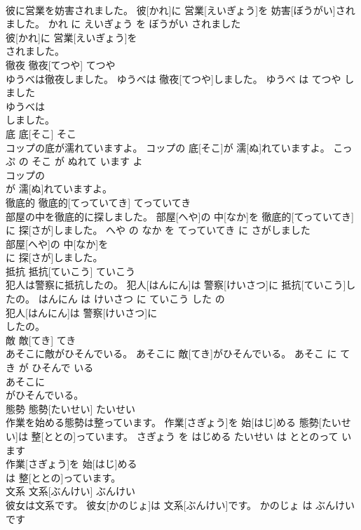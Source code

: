 \documentclass[8pt]{extreport}
\begin{document}
\begin{CJK}{UTF8}{min}
\\	彼に営業を妨害されました。	彼[かれ]に 営業[えいぎょう]を 妨害[ぼうがい]されました。	かれ に えいぎょう を ぼうがい されました	
\\	彼[かれ]に 営業[えいぎょう]を
\\	されました。			
\\	徹夜	徹夜[てつや]	てつや	
\\	ゆうべは徹夜しました。	ゆうべは 徹夜[てつや]しました。	ゆうべ は てつや しました	
\\	ゆうべは
\\	しました。			
\\	底	底[そこ]	そこ	
\\	コップの底が濡れていますよ。	コップの 底[そこ]が 濡[ぬ]れていますよ。	こっぷ の そこ が ぬれて います よ	
\\	コップの
\\	が 濡[ぬ]れていますよ。			
\\	徹底的	徹底的[てっていてき]	てっていてき	
\\	部屋の中を徹底的に探しました。	部屋[へや]の 中[なか]を 徹底的[てっていてき]に 探[さが]しました。	へや の なか を てっていてき に さがしました	
\\	部屋[へや]の 中[なか]を
\\	に 探[さが]しました。			
\\	抵抗	抵抗[ていこう]	ていこう	
\\	犯人は警察に抵抗したの。	犯人[はんにん]は 警察[けいさつ]に 抵抗[ていこう]したの。	はんにん は けいさつ に ていこう した の	
\\	犯人[はんにん]は 警察[けいさつ]に
\\	したの。			
\\	敵	敵[てき]	てき	
\\	あそこに敵がひそんでいる。	あそこに 敵[てき]がひそんでいる。	あそこ に てき が ひそんで いる	
\\	あそこに
\\	がひそんでいる。			
\\	態勢	態勢[たいせい]	たいせい	
\\	作業を始める態勢は整っています。	作業[さぎょう]を 始[はじ]める 態勢[たいせい]は 整[ととの]っています。	さぎょう を はじめる たいせい は ととのって います	
\\	作業[さぎょう]を 始[はじ]める
\\	は 整[ととの]っています。			
\\	文系	文系[ぶんけい]	ぶんけい	
\\	彼女は文系です。	彼女[かのじょ]は 文系[ぶんけい]です。	かのじょ は ぶんけい です	

\end{CJK}
\end{document}
